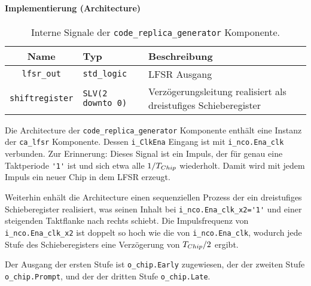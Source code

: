 
\paragraph{Implementierung (Architecture)}

\begin{table}[htbp]
    \ttabbox
    {
        \caption[Code Replika Generator interne Signale]{Interne Signale der \lstinline$code_replica_generator$ Komponente.}
        \label{TabCodeGen_ArchSignals}
    }
    {
    \begin{tabular}{c  p{2cm} p{6cm}}
        \toprule
        Name      & Typ         & Beschreibung \\
        \midrule
        \lstinline$lfsr_out$  & \lstinline$std_logic$             & LFSR Ausgang\\
        \lstinline$shiftregister$  & \lstinline$SLV(2 downto 0)$             &  Verzögerungsleitung realisiert als dreistufiges Schieberegister\\
        \bottomrule
    \end{tabular}
}
\end{table}

\begin{sloppypar}
Die Architecture der \lstinline$code_replica_generator$ Komponente enthält eine Instanz der \lstinline$ca_lfsr$ Komponente. Dessen \lstinline$i_ClkEna$ Eingang ist mit \lstinline$i_nco.Ena_clk$ verbunden. Zur Erinnerung: Dieses Signal ist ein Impuls, der für genau eine Taktperiode \lstinline$'1'$ ist und sich etwa alle $1/{T}_{Chip}$ wiederholt. Damit wird mit jedem Impuls ein neuer Chip in dem \gls{LFSR} erzeugt.
\end{sloppypar}

Weiterhin enhält die Architecture einen sequenziellen Prozess der ein dreistufiges Schieberegister realisiert, was seinen Inhalt bei \lstinline$i_nco.Ena_clk_x2='1'$ und einer steigenden Taktflanke nach rechts schiebt. Die Impulsfrequenz von \lstinline$i_nco.Ena_clk_x2$ ist doppelt so hoch wie die von \lstinline$i_nco.Ena_clk$, wodurch jede Stufe des Schieberegisters eine Verzögerung von ${T}_{Chip} /2$ ergibt.

Der Ausgang der ersten Stufe ist \lstinline$o_chip.Early$ zugewiesen, der der zweiten Stufe \lstinline$o_chip.Prompt$, und der der dritten Stufe \lstinline$o_chip.Late$.
